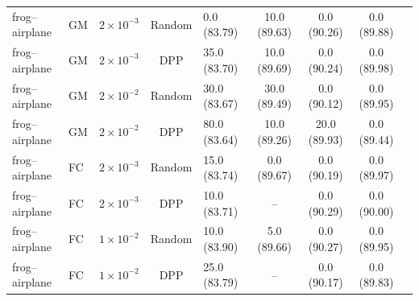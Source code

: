 \begin{table}[t]
{\begin{tabular}{lllclcccc}
\midrule

frog--airplane & GM &
$2{\times}10^{-3}$ & Random & 0.0 \small{(83.79)} & 10.0 \small{(89.63)} & 0.0 \small{(90.26)} & 0.0 \small{(89.88)} \\
frog--airplane & GM &
$2{\times}10^{-3}$ & DPP & 35.0 \small{(83.70)} & 10.0 \small{(89.69)} & 0.0 \small{(90.24)} & 0.0 \small{(89.98)} \\

frog--airplane & GM &
$2{\times}10^{-2}$ & Random & 30.0 \small{(83.67)} & 30.0 \small{(89.49)} & 0.0 \small{(90.12)} & 0.0 \small{(89.95)} \\
frog--airplane & GM &
$2{\times}10^{-2}$ & DPP & 80.0 \small{(83.64)} & 10.0 \small{(89.26)} & 20.0 \small{(89.93)} & 0.0 \small{(89.44)} \\

\addlinespace
frog--airplane & FC &
$2{\times}10^{-3}$ & Random & 15.0 \small{(83.74)} & 0.0 \small{(89.67)} & 0.0 \small{(90.19)} & 0.0 \small{(89.97)} \\
frog--airplane & FC &
$2{\times}10^{-3}$ & DPP & 10.0 \small{(83.71)} & -- & 0.0 \small{(90.29)} & 0.0 \small{(90.00)} \\

frog--airplane & FC &
$1{\times}10^{-2}$ & Random & 10.0 \small{(83.90)} & 5.0 \small{(89.66)} & 0.0 \small{(90.27)} & 0.0 \small{(89.95)} \\
frog--airplane & FC &
$1{\times}10^{-2}$ & DPP & 25.0 \small{(83.79)} & -- & 0.0 \small{(90.17)} & 0.0 \small{(89.83)} \\

\bottomrule
\end{tabular}
}
\end{table}
